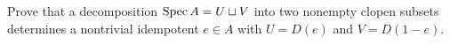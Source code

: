 \begin{problem}\label{chal:vi17-c04}
Prove that a decomposition $\operatorname{Spec} A=U\sqcup V$ into two nonempty clopen subsets determines a nontrivial idempotent $e\in A$ with $U=D(e)$ and $V=D(1-e)$.
\end{problem}
